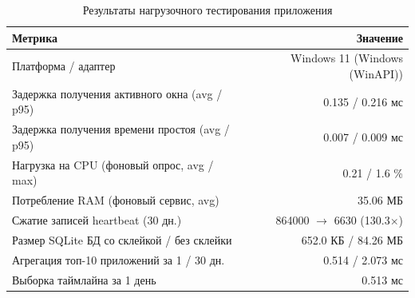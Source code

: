 \begin{table}[htbp]
    \centering
    \caption{Результаты нагрузочного тестирования приложения}
    \label{tab:benchmark_results}
    \begin{tabular}{|l|r|}
        \hline
        \textbf{Метрика} & \textbf{Значение} \\
        \hline
        Платформа / адаптер & Windows 11 (Windows (WinAPI)) \\
        Задержка получения активного окна (avg / p95) & 0.135 / 0.216 мс \\
        Задержка получения времени простоя (avg / p95) & 0.007 / 0.009 мс \\
        Нагрузка на CPU (фоновый опрос, avg / max) & 0.21 / 1.6 \% \\
        Потребление RAM (фоновый сервис, avg) & 35.06 МБ \\
        Сжатие записей heartbeat (30 дн.) & 864000 $\rightarrow$ 6630 (130.3$\times$) \\
        Размер SQLite БД со склейкой / без склейки & 652.0 КБ / 84.26 МБ \\
        Агрегация топ-10 приложений за 1 / 30 дн. & 0.514 / 2.073 мс \\
        Выборка таймлайна за 1 день & 0.513 мс \\
        \hline
    \end{tabular}
\end{table}
